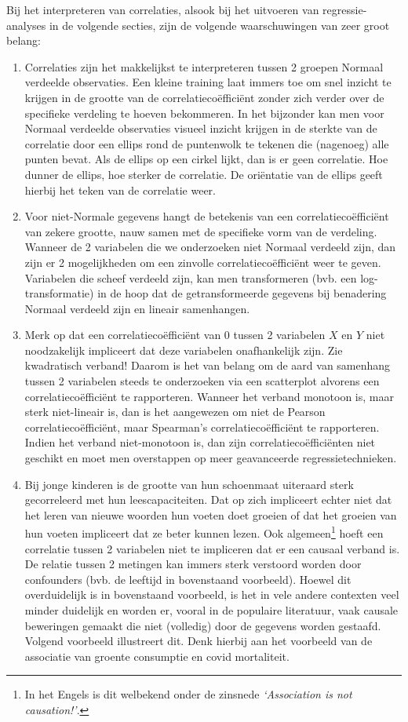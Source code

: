 \documentclass[
  12pt,dutch,coursenotes]{book}
\theoremstyle{definition}
\theoremstyle{definition}
\theoremstyle{definition}
\theoremstyle{definition}
\theoremstyle{remark}
\begin{document}
Bij het interpreteren van correlaties, alsook bij het uitvoeren van
regressie-analyses in de volgende secties, zijn de volgende waarschuwingen
van zeer groot belang:

\begin{enumerate}
\def\labelenumi{\arabic{enumi}.}
\item
  Correlaties zijn het makkelijkst te interpreteren tussen 2 groepen Normaal verdeelde observaties. Een kleine training laat immers toe om snel inzicht te krijgen in de grootte van de correlatiecoëfficiënt zonder zich verder over de specifieke verdeling te hoeven bekommeren. In het bijzonder kan men voor Normaal verdeelde observaties visueel inzicht krijgen in de sterkte van de correlatie door een ellips rond de puntenwolk te tekenen die (nagenoeg) alle punten bevat. Als de ellips op een cirkel lijkt, dan is er geen correlatie. Hoe dunner de ellips, hoe sterker de correlatie. De oriëntatie van de ellips geeft hierbij het teken van de correlatie weer.
\item
  Voor niet-Normale gegevens hangt de betekenis van een correlatiecoëfficiënt van zekere grootte, nauw samen met de specifieke vorm van de verdeling. Wanneer de 2 variabelen die we onderzoeken niet Normaal verdeeld zijn, dan zijn er 2 mogelijkheden om een zinvolle correlatiecoëfficiënt weer te geven. Variabelen die scheef verdeeld zijn, kan men transformeren (bvb. een log-transformatie) in de hoop dat de getransformeerde gegevens bij benadering Normaal verdeeld zijn en lineair samenhangen.
\item
  Merk op dat een correlatiecoëfficiënt van 0 tussen 2 variabelen \(X\) en \(Y\) niet noodzakelijk impliceert dat deze variabelen onafhankelijk zijn. Zie kwadratisch verband! Daarom is het van belang om de aard van samenhang tussen 2 variabelen steeds te onderzoeken via een scatterplot alvorens een correlatiecoëfficiënt te rapporteren. Wanneer het verband monotoon is, maar sterk niet-lineair is, dan is het aangewezen om niet de Pearson correlatiecoëfficiënt, maar Spearman's correlatiecoëfficiënt te rapporteren. Indien het verband niet-monotoon is, dan zijn correlatiecoëfficiënten niet geschikt en moet men overstappen op meer geavanceerde regressietechnieken.
\item
  Bij jonge kinderen is de grootte van hun schoenmaat uiteraard sterk gecorreleerd met hun leescapaciteiten. Dat op zich impliceert echter niet dat het leren van nieuwe woorden hun voeten doet groeien of dat het groeien van hun voeten impliceert dat ze beter kunnen lezen. Ook algemeen\footnote{In het Engels is dit welbekend onder de zinsnede \emph{`Association is not causation!'}.} hoeft een correlatie tussen 2 variabelen niet te impliceren dat er een causaal verband is. De relatie tussen 2 metingen kan immers sterk verstoord worden door confounders (bvb. de leeftijd in bovenstaand voorbeeld). Hoewel dit overduidelijk is in bovenstaand voorbeeld, is het in vele andere contexten veel minder duidelijk en worden er, vooral in de populaire literatuur, vaak causale beweringen gemaakt die niet (volledig) door de gegevens worden gestaafd. Volgend voorbeeld illustreert dit. Denk hierbij aan het voorbeeld van de associatie van groente consumptie en covid mortaliteit.

\end{enumerate}
\end{document}
